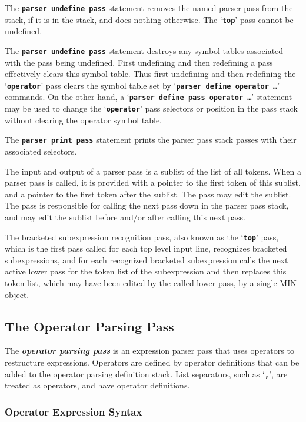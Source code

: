 \documentclass[12pt]{article}
\newcommand{\TT}[1]{{\tt \bfseries #1}}
\newcommand{\key}[1]{{\bf \em #1}\index{#1}}
\begin{document}
The \TT{parser undefine pass} statement removes the named
parser pass from the stack, if it is in the stack, and does
nothing otherwise.  The `\TT{top}' pass cannot be undefined.

The \TT{parser undefine pass} statement destroys any symbol
tables associated with the pass being undefined.  First undefining and then
redefining a pass effectively clears this symbol table.  Thus
first undefining and then redefining the `\TT{operator}' pass
clears the symbol table set by `\TT{parser define operator \ldots}'
commands.  On the other hand,
a `\TT{parser define pass operator \ldots}' statement 
may be used to change the `\TT{operator}' pass selectors or
position in the pass stack without clearing the operator symbol
table.

The \TT{parser print pass} statement prints the parser pass stack passes
with their associated selectors.

The input and output of a parser pass is a sublist of the list
of all tokens.  When a parser pass is called, it is provided with
a pointer to the first token of this sublist, and a pointer to the
first token after the sublist.  The pass may edit the sublist.
The pass is responsible for calling the next pass down in the parser
pass stack, and may edit the sublist before and/or after calling
this next pass.

The bracketed subexpression recognition pass, also known as the `\TT{top}' pass,
which is the first pass called for each
top level input line, recognizes bracketed subexpressions,
and for each recognized bracketed subexpression
calls the next active lower pass for the token list of the subexpression
and then replaces this token list, which may have been edited by
the called lower pass, by a single MIN object.

\subsection{The Operator Parsing Pass}
\label{OPERATOR-PARSING-PASS}

The \key{operator parsing pass} is an expression parser pass that uses
operators to restructure expressions.  Operators
are defined by operator definitions that can be added to the operator
parsing definition stack.  List separators, such as `\TT{,}', are treated
as operators, and have operator definitions.

\subsubsection{Operator Expression Syntax}
\label{OPERATOR-EXPRESSION-SYNTAX}
\end{document}
